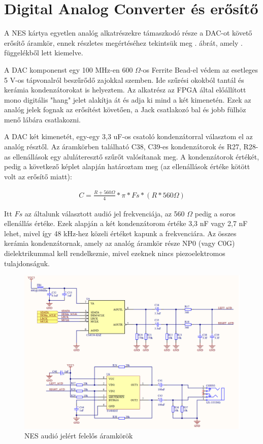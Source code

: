 \section{Digital Analog Converter és erősítő}
	
	A NES kártya egyetlen analóg alkatrészekre támaszkodó része a DAC-ot követő erősítő áramkör, ennek részletes megértéséhez tekintsük meg . ábrát, amely . függelékből lett kiemelve.
	
	A DAC komponenst egy 100 MHz-en 600 $\Omega$-os Ferrite Bead-el védem az esetleges 5 V-os tápvonalról beszűrődő zajokkal szemben. Ide szűrési okokból tantál és kerámia kondenzátorokat is helyeztem. Az alkatrész az FPGA által előállított mono digitális "hang" jelet alakítja át és adja ki mind a két kimenetén. Ezek az analóg jelek fognak az erősítést követően, a Jack csatlakozó bal és jobb fülhöz menő lábára csatlakozni. 
	
	A DAC két kimenetét, egy-egy 3,3 uF-os csatoló kondenzátorral választom el az analóg résztől. Az áramkörben található C38, C39-es kondenzátorok és R27, R28-as ellenállások egy aluláteresztő szűrőt valósítanak meg. A kondenzátorok értékét, pedig a következő képlet alapján határoztam meg (az ellenállások értéke kötött volt az erősítő miatt):
	
	\begin{align}	
		C = \frac{R + 560 \Omega}{4} *\pi * Fs * (R * 560 \Omega)
	\end{align} 
	
	Itt $Fs$ az általunk választott audió jel frekvenciája, az 560 $\Omega$ pedig a soros ellenállás értéke. Ezek alapján a két kondenzátorom értéke 3,3 nF vagy 2,7 nF lehet, mivel így 48 kHz-hez közeli értéket kapunk a frekvenciára. Az összes kerámia kondenzátornak, amely az analóg áramkör része NP0 (vagy C0G) dielektrikummal kell rendelkeznie, mivel ezeknek nincs piezoelektromos tulajdonságuk.   
	
	\begin{figure}[H]
		\centering
		\includegraphics[width=150mm, keepaspectratio]{figures/DAC-AMP-JACK}
		\caption{NES audió jelért felelős áramkörök}
		\label{fig:DAC-AMP-JACK}
	\end{figure}
	
